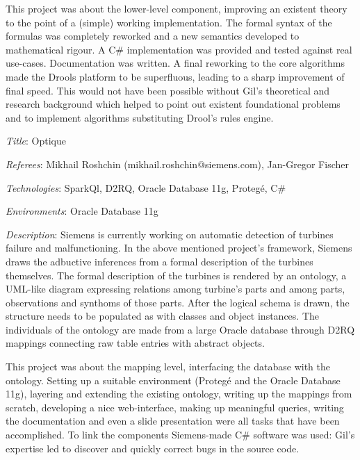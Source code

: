 \documentclass[letterpaper]{article}
\renewenvironment{itemize}{
  \begin{list}{}{
    \setlength{\leftmargin}{1.5em}
  }
}{
  \end{list}
}
\newenvironment{itemize1}{
  \begin{list}{}{
    \setlength{\leftmargin}{0em}
  }
}{
  \end{list}
}
\begin{document}
\begin{itemize1}
\begin{itemize}
This project was about the lower-level component, improving an existent theory to the point of a (simple) working implementation. The formal syntax of the formulas was completely reworked and a new semantics developed to mathematical rigour. A C\# implementation was provided and tested against real use-cases. Documentation was written. A final reworking to the core algorithms made the Drools platform to be superfluous, leading to a sharp improvement of final speed. This would not have been possible without Gil's theoretical and research background which helped to  point out existent foundational problems and to implement algorithms substituting Drool's rules engine.
\end{itemize}

\bigskip
\item
\begin{itemize}
\item {\it Title}: Optique
\item {\it Referees}: Mikhail Roshchin (mikhail.roshchin@siemens.com), Jan-Gregor Fischer
\item {\it Technologies}: SparkQl, D2RQ, Oracle Database 11g, Proteg\'e, C\# 
\item {\it Environments}: Oracle Database 11g
\item {\it Description}: Siemens is currently working on automatic detection of turbines failure and malfunctioning. 
In the above mentioned project's framework, Siemens draws the adbuctive inferences from a formal description of the turbines themselves. The formal description of the turbines is rendered by an ontology, a UML-like diagram expressing relations among turbine's parts and among parts, observations and synthoms of those parts. After the logical schema is drawn, the structure needs to be populated as with classes and object instances. The individuals of the ontology are made from a large Oracle database through D2RQ mappings connecting raw table entries with abstract objects. 
\medskip

This project was about the mapping level, interfacing the database with the ontology. Setting up a suitable environment (Proteg\'e and the Oracle Database 11g), layering and extending the existing ontology, writing up the mappings from scratch, developing a nice web-interface, making up meaningful queries, writing the documentation and even a slide presentation were all tasks that have been accomplished. To link the components Siemens-made C\# software was used: Gil's expertise led to discover and quickly correct bugs in the source code. 
\end{itemize}
\end{itemize1}
\end{document}
